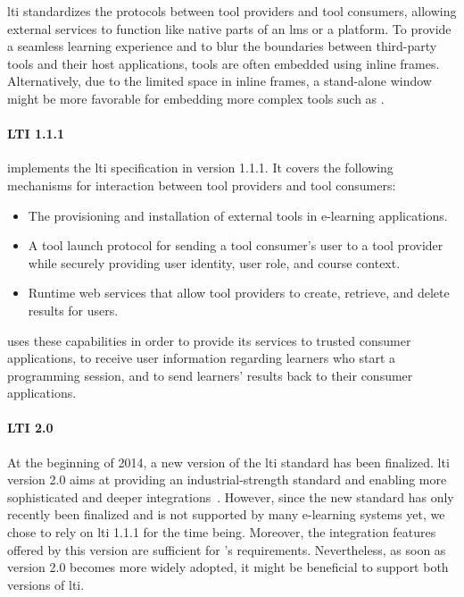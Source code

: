 \Gls{lti} standardizes the protocols between tool providers and tool consumers, allowing external services to function like native parts of an \gls{lms} or a \mooc platform. To provide a seamless learning experience and to blur the boundaries between third-party tools and their host applications, tools are often embedded using inline frames. Alternatively, due to the limited space in inline frames, a stand-alone window might be more favorable for embedding more complex tools such as \tool.

\paragraph{LTI 1.1.1}

\tool implements the \gls{lti} specification in version 1.1.1. It covers the following mechanisms for interaction between tool providers and tool consumers:

\begin{itemize}
\item
  The provisioning and installation of external tools in e-learning applications.
\item
  A tool launch protocol for sending a tool consumer's user to a tool provider while securely providing user identity, user role, and course context.
\item
  Runtime web services that allow tool providers to create, retrieve, and delete results for users.
\end{itemize}

\tool uses these capabilities in order to provide its services to trusted consumer applications, to receive user information regarding learners who start a programming session, and to send learners' results back to their consumer applications.

\paragraph{LTI 2.0}

At the beginning of 2014, a new version of the \gls{lti} standard has been finalized. \gls{lti} version 2.0 aims at providing an industrial-strength standard and enabling more sophisticated and deeper integrations~\cite{abel2014lti}. However, since the new standard has only recently been finalized and is not supported by many e-learning systems yet, we chose to rely on \gls{lti} 1.1.1 for the time being. Moreover, the integration features offered by this version are sufficient for \tool's requirements. Nevertheless, as soon as version 2.0 becomes more widely adopted, it might be beneficial to support both versions of \gls{lti}.
